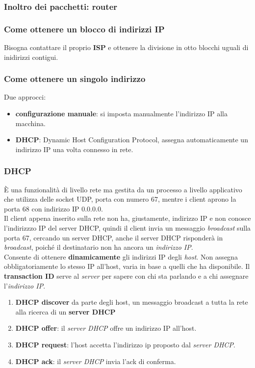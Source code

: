 \subsubsection{Inoltro dei pacchetti: router}

\subsubsection{Come ottenere un blocco di indirizzi IP}
Bisogna contattare il proprio \textbf{ISP} e ottenere la divisione in otto blocchi uguali di inidirizzi contigui. 

\subsubsection{Come ottenere un singolo indirizzo}
Due approcci:
\begin{itemize}
  \item \textbf{configurazione manuale}: si imposta manualmente l'indirizzo IP alla macchina. 
  \item \textbf{DHCP}: Dynamic Host Configuration Protocol, assegna automaticamente un indirizzo IP una volta connesso in rete.  
\end{itemize}

\subsubsection{DHCP}
È una funzionalità di livello rete ma gestita da un processo a livello applicativo che utilizza delle socket UDP, porta con numero 67, mentre i client aprono la porta 68 con indirizzo IP $0.0.0.0$. \\ 
Il client appena inserito sulla rete non ha, giustamente, indirizzo IP e non conosce l'indirizzzo IP del server DHCP, quindi il client invia un messaggio \textit{broadcast} sulla porta 67, cercando un server DHCP, anche il server DHCP risponderà in \textit{broadcast}, poiché il destinatario non ha ancora un \textit{indirizzo IP}. \\ 
Consente di ottenere \textbf{dinamicamente} gli indirizzi IP degli \textit{host}. Non assegna obbligatoriamente lo stesso IP all'host, varia in base a quelli che ha disponibile. Il \textbf{transaction ID} serve al \textit{server} per sapere con chi sta parlando e a chi assegnare l'\textit{indirizzo IP}. \\ 
\begin{enumerate}
  \item \textbf{DHCP discover} da parte degli host, un messaggio broadcast a tutta la rete alla ricerca di un \textbf{server DHCP} 
  \item \textbf{DHCP offer}: il \textit{server DHCP} offre un indirizzo IP all'host. 
  \item \textbf{DHCP request}: l'host accetta l'indirizzo ip proposto dal \textit{server DHCP}. 
  \item \textbf{DHCP ack}: il \textit{server DHCP} invia l'ack di conferma. 
\end{enumerate}

